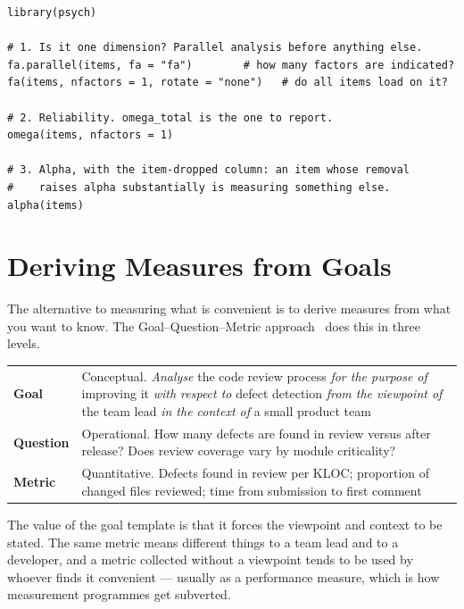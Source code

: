 \begin{lstlisting}[language=Rlang, caption={Reliability done properly: dimensionality
first, then omega, then alpha for the reviewers who expect it.}]
library(psych)

# 1. Is it one dimension? Parallel analysis before anything else.
fa.parallel(items, fa = "fa")        # how many factors are indicated?
fa(items, nfactors = 1, rotate = "none")   # do all items load on it?

# 2. Reliability. omega_total is the one to report.
omega(items, nfactors = 1)

# 3. Alpha, with the item-dropped column: an item whose removal
#    raises alpha substantially is measuring something else.
alpha(items)
\end{lstlisting}

\section{Deriving Measures from Goals}

The alternative to measuring what is convenient is to derive measures from what
you want to know. The Goal--Question--Metric approach~\cite{basili1994goal} does
this in three levels.

\begin{center}
\small
\begin{tabular}{@{}L{2.0cm}L{12.3cm}@{}}
\toprule
\textbf{Goal}   & Conceptual. \emph{Analyse} the code review process
                  \emph{for the purpose of} improving it \emph{with respect to}
                  defect detection \emph{from the viewpoint of} the team lead
                  \emph{in the context of} a small product team \\
\textbf{Question} & Operational. How many defects are found in review versus
                  after release? Does review coverage vary by module
                  criticality? \\
\textbf{Metric} & Quantitative. Defects found in review per KLOC; proportion of
                  changed files reviewed; time from submission to first comment \\
\bottomrule
\end{tabular}
\end{center}

The value of the goal template is that it forces the viewpoint and context to
be stated. The same metric means different things to a team lead and to a
developer, and a metric collected without a viewpoint tends to be used by
whoever finds it convenient --- usually as a performance measure, which is how
measurement programmes get subverted.

